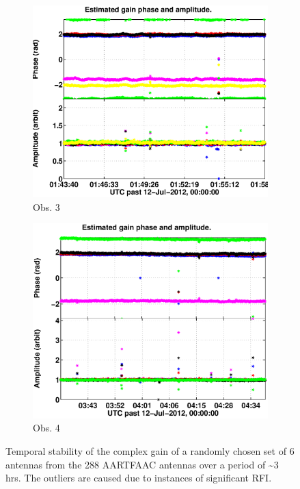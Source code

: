 \documentclass{aa}
\begin{document}
\begin{figure}[tbh]

\begin{subfigure}[b]{\columnwidth}
\includegraphics[width=1\columnwidth]{Figs/SB002_LBA_OUTER_SPREAD_1ch_8_convcalsol_bin_gains.eps}
\caption{Obs. 3}
\end{subfigure}

\begin{subfigure}[b]{\columnwidth}
\includegraphics[width=1\columnwidth]{Figs/combined_SB002_2_convcalsol_bin_gains.eps}
\caption{Obs. 4}
\end{subfigure}

\caption{\label{fig:gain-Temporal-stability}Temporal  stability  of the  complex
  gain of  a randomly chosen  set of 6  antennas from the 288  AARTFAAC antennas
  over  a  period  of \textasciitilde3  hrs.  The  outliers  are caused  due  to
  instances of significant RFI.}
\end{figure}
\end{document}
